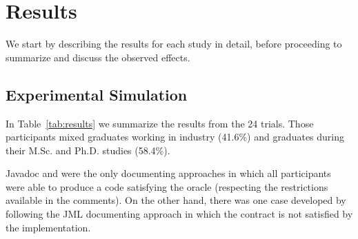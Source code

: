 \section{Results}
\label{results}

We start by describing the results for each study in detail, before proceeding to summarize and discuss the observed effects.

\subsection{Experimental Simulation}
\label{sec:expResults}

In Table~\ref{tab:results} we summarize the results from the 24 trials. Those participants mixed graduates working in industry (41.6\%) and graduates during their M.Sc. and Ph.D. studies (58.4\%).

Javadoc and \contractjdoc{} were the only documenting approaches in
which all participants were able to produce a code satisfying the oracle
(respecting the restrictions available in the comments). On the other hand,
there was one case developed by following the JML documenting approach in which
the contract is not satisfied by the implementation.



